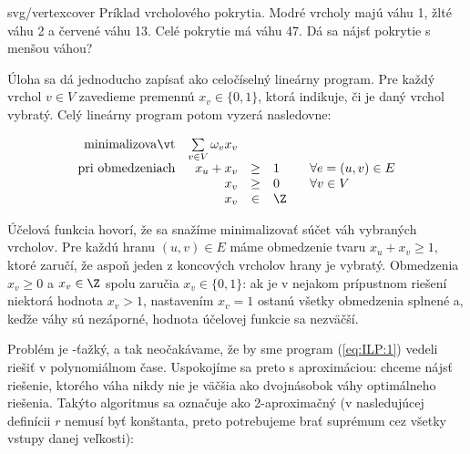 \begin{myfig}{0.8\textwidth}{svg/vertexcover}
  Príklad vrcholového pokrytia. Modré vrcholy majú váhu 1, žlté váhu 2 a červené váhu 13. 
  Celé pokrytie má váhu 47. Dá sa nájsť pokrytie s menšou váhou?
\end{myfig}

\noindent Úloha sa dá jednoducho zapísať ako celočíselný lineárny program. Pre
každý vrchol $v\in V$ zavedieme premennú $x_v\in\{0,1\}$, ktorá indikuje, či je
daný vrchol vybratý.  Celý lineárny program potom vyzerá nasledovne:

\begin{equation}
\label{eq:ILP:1}
\begin{array}{rrcll}
  {\rm minimalizovať}     & \multicolumn{1}{l}{\sum\limits_{v\in V}\omega_vx_v}\\
  {\rm pri\ obmedzeniach} & x_u + x_v&\ge&1& \;\;\;\forall e=(u,v)\in E\\
                          & x_v&\ge&0& \;\;\;\forall v\in V\\
                          & x_v&\in&\Z
\end{array}
\end{equation}

\noindent
Účelová funkcia hovorí, že sa snažíme minimalizovať súčet váh vybraných
vrcholov.  Pre každú hranu $(u,v)\in E$ máme obmedzenie tvaru $x_u+x_v\ge 1$,
ktoré zaručí, že aspoň jeden z koncových vrcholov hrany je vybratý. Obmedzenia
$x_v\ge0$ a $x_v\in\Z$ spolu zaručia $x_v\in\{0,1\}$: ak je v nejakom
prípustnom riešení niektorá hodnota $x_v>1$, nastavením $x_v=1$ ostanú všetky
obmedzenia splnené a, keďže váhy sú nezáporné, hodnota účelovej funkcie sa
nezväčší.

Problém \minvcover je \NP-ťažký, a tak neočakávame, že by sme program
(\ref{eq:ILP:1}) vedeli riešiť v polynomiálnom čase. Uspokojíme sa preto s
aproximáciou: chceme nájsť riešenie, ktorého váha nikdy nie je väčšia ako
dvojnásobok váhy optimálneho riešenia. Takýto algoritmus sa označuje ako
2-aproximačný (v nasledujúcej definícii $r$ nemusí byť konštanta, preto
potrebujeme brať suprémum cez všetky vstupy danej veľkosti):

